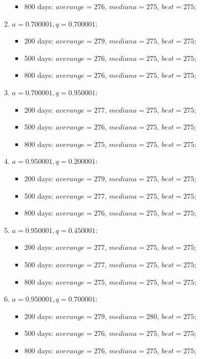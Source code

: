 \begin{enumerate}
\begin{enumerate}
\begin{itemize}
			\item 800 days: $averange = 276$, $mediana = 275$, $best = 275$;
		\end{itemize}
		\item $a= 0.700001, q= 0.700001$:
		\begin{itemize}
			\item 200 days: $averange = 279$, $mediana = 275$, $best = 275$;
			\item 500 days: $averange = 276$, $mediana = 275$, $best = 275$;
			\item 800 days: $averange = 276$, $mediana = 275$, $best = 275$;
		\end{itemize}
		\item $a= 0.700001, q= 0.950001$:
		\begin{itemize}
			\item 200 days: $averange = 277$, $mediana = 275$, $best = 275$;
			\item 500 days: $averange = 276$, $mediana = 275$, $best = 275$;
			\item 800 days: $averange = 275$, $mediana = 275$, $best = 275$;
		\end{itemize}
		\item $a= 0.950001, q= 0.200001$:
		\begin{itemize}
			\item 200 days: $averange = 279$, $mediana = 275$, $best = 275$;
			\item 500 days: $averange = 277$, $mediana = 275$, $best = 275$;
			\item 800 days: $averange = 276$, $mediana = 275$, $best = 275$;
		\end{itemize}
		\item $a= 0.950001, q= 0.450001$:
		\begin{itemize}
			\item 200 days: $averange = 277$, $mediana = 275$, $best = 275$;
			\item 500 days: $averange = 277$, $mediana = 275$, $best = 275$;
			\item 800 days: $averange = 275$, $mediana = 275$, $best = 275$;
		\end{itemize}
		\item $a= 0.950001, q= 0.700001$:
		\begin{itemize}
			\item 200 days: $averange = 279$, $mediana = 280$, $best = 275$;
			\item 500 days: $averange = 276$, $mediana = 275$, $best = 275$;
			\item 800 days: $averange = 276$, $mediana = 275$, $best = 275$;

\end{itemize}
\end{enumerate}
\end{enumerate}

